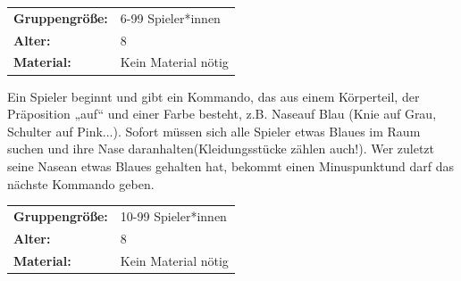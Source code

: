 \begin{table}[H]
\begin{tabular}{>{\bfseries}lp{8cm}}
  Gruppengröße:   & 6-99 Spieler*innen\\
    Alter: & 8 \\
    Material: & Kein Material nötig \\ 
\end{tabular}
\end{table} 
Ein Spieler beginnt und gibt ein Kommando, das aus einem Körperteil, der Präposition „auf“ und einer Farbe besteht, z.B. Naseauf Blau (Knie auf Grau, Schulter auf Pink...). Sofort müssen sich alle Spieler etwas Blaues im Raum suchen und ihre Nase daranhalten(Kleidungsstücke zählen auch!). Wer zuletzt seine  Nasean etwas Blaues gehalten hat, bekommt einen Minuspunktund darf das  nächste Kommando geben. \\




\begin{table}[H]
\begin{tabular}{>{\bfseries}lp{8cm}}
   Gruppengröße:   & 10-99 Spieler*innen\\
    Alter: & 8 \\
    Material: & Kein Material nötig \\
\end{tabular}
\end{table} 

